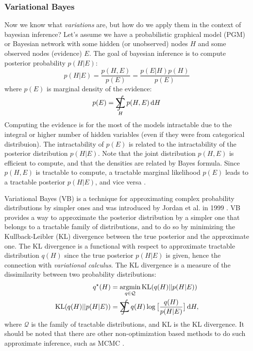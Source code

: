 \subsubsection*{Variational Bayes}
Now we know what \textit{variations} are, but how do we apply them in the context of bayesian inference? Let's assume we have a probabilistic
graphical model (PGM) or Bayesian network \cite{graphical-models-2023} with some hidden (or unobserved) nodes $H$ and some observed nodes (evidence) $E$. The goal 
of bayesian inference is to compute posterior probability $p(H|E)$:
$$
p(H|E) = \frac{p(H,E)}{p(E)} = \frac{p(E|H) p(H)}{p(E)}
$$ 
where $p(E)$ is marginal density of the evidence:
$$
p(E) = \SumInt_{H} p(H,E)\, \d H
$$
Computing the evidence is for the most of the models intractable due to the integral or higher number of hidden variables (even if they were from
categorical distribuion). The intractability of $p(E)$ is related to the intractability of the
posterior distribution $p(H|E)$. Note that the joint distribution $p(H, E)$ is efficient to compute, and that the densities are related by Bayes formula.
Since $p(H, E)$ is tractable to compute, a tractable marginal likelihood $p(E)$ leads to a tractable posterior $p(H|E)$, and vice versa \cite{intro-vae-2019,vb-intro-1999}.
 
Variational Bayes (VB) is a technique for approximating complex probability distributions by simpler ones and was introduced by Jordan et al. in 1999 \cite{vb-intro-1999}. 
VB provides a way to approximate the posterior distribution by a simpler one that belongs to a tractable family of distributions, and to do so
by minimizing the Kullback-Leibler (KL) divergence between the true posterior and the approximate one. The KL divergence is a functional with respect 
to approximate tractable distribution $q(H)$ since the true posterior $p(H|E)$ is given, hence the connection with \textit{variational calculus}.  
The KL divergence is a measure of the dissimilarity between two probability distributions:
\begin{align*}
q^\star(H) &= \argmin_{q \in \mathcal{Q}} \mathrm{KL}(q(H) || p(H | E)) \\
\mathrm{KL}(q(H) || p(H | E)) &= \SumInt q(H) \log \big[ \frac{q(H)}{p(H|E)} \big]\,\d H,
\end{align*}
where $\mathcal{Q}$ is the family of tractable distributions, and $\mathrm{KL}$ is the KL divergence. It should be noted that there are other 
non-optimization based methods to do such approximate inference, such as MCMC \cite{wiki-mcmc-2023}. 

